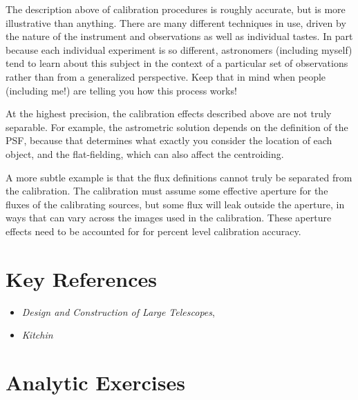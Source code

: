 The description above of calibration procedures is roughly accurate,
but is more illustrative than anything. There are many different
techniques in use, driven by the nature of the instrument and
observations as well as individual tastes. In part because each
individual experiment is so different, astronomers (including myself)
tend to learn about this subject in the context of a particular set of
observations rather than from a generalized perspective. Keep that in
mind when people (including me!) are telling you how this process
works!

At the highest precision, the calibration effects described above are
not truly separable. For example, the astrometric solution depends on
the definition of the PSF, because that determines what exactly you
consider the location of each object, and the flat-fielding, which can
also affect the centroiding.

A more subtle example is that the flux definitions cannot truly be
separated from the calibration. The calibration must assume some
effective aperture for the fluxes of the calibrating sources, but some
flux will leak outside the aperture, in ways that can vary across the
images used in the calibration. These aperture effects need to be
accounted for for percent level calibration accuracy.

\section{Key References}

\begin{itemize}
  \item
    {\it Design and Construction of Large Telescopes},
      \citet{bely}
  \item
    {\it Kitchin}
\end{itemize}

\citet{gunn06a}


\section{Analytic Exercises}


